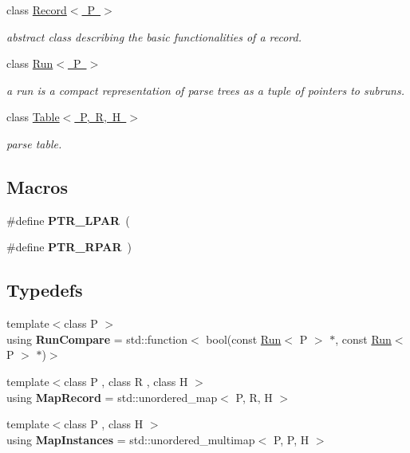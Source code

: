 \begin{DoxyCompactItemize}
class \mbox{\hyperlink{classRecord}{Record$<$ P $>$}}
\begin{DoxyCompactList}\small\item\em abstract class describing the basic functionalities of a record. \end{DoxyCompactList}\item 
class \mbox{\hyperlink{classRun}{Run$<$ P $>$}}
\begin{DoxyCompactList}\small\item\em a run is a compact representation of parse trees as a tuple of pointers to subruns. \end{DoxyCompactList}\item 
class \mbox{\hyperlink{classTable}{Table$<$ P, R, H $>$}}
\begin{DoxyCompactList}\small\item\em parse table. \end{DoxyCompactList}\end{DoxyCompactItemize}
\subsection*{Macros}
\begin{DoxyCompactItemize}
\item 
\mbox{\label{group__table_ga87af6cf583d4ad6776fb6d5547cecdf0}} 
\#define {\bfseries P\+T\+R\+\_\+\+L\+P\+AR}~\textquotesingle{}(\textquotesingle{}
\item 
\mbox{\label{group__table_ga872ca8d837f318949c33691219969c5b}} 
\#define {\bfseries P\+T\+R\+\_\+\+R\+P\+AR}~\textquotesingle{})\textquotesingle{}
\end{DoxyCompactItemize}
\subsection*{Typedefs}
\begin{DoxyCompactItemize}
\item 
\mbox{\label{group__table_gab0f46315460c3a5ebd31a85b96a5bd52}} 
{\footnotesize template$<$class P $>$ }\\using {\bfseries Run\+Compare} = std\+::function$<$ bool(const \mbox{\hyperlink{classRun}{Run}}$<$ P $>$ $\ast$, const \mbox{\hyperlink{classRun}{Run}}$<$ P $>$ $\ast$)$>$
\item 
\mbox{\label{group__table_ga72ef50ecaa053517b9a0248d9fd8b942}} 
{\footnotesize template$<$class P , class R , class H $>$ }\\using {\bfseries Map\+Record} = std\+::unordered\+\_\+map$<$ P, R, H $>$
\item 
\mbox{\label{group__table_ga1a3458aadde4572a615622fa95c4216d}} 
{\footnotesize template$<$class P , class H $>$ }\\using {\bfseries Map\+Instances} = std\+::unordered\+\_\+multimap$<$ P, P, H $>$
\end{DoxyCompactItemize}
